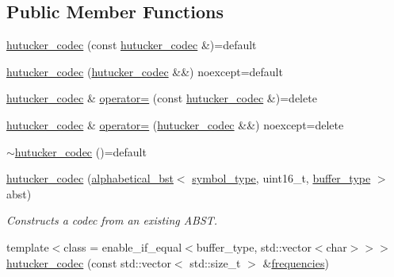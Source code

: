 \subsection*{Public Member Functions}
\begin{DoxyCompactItemize}
\item 
\mbox{\hyperlink{classirk_1_1hutucker__codec_af44e54c9f8257df294e4c879d610281b}{hutucker\+\_\+codec}} (const \mbox{\hyperlink{classirk_1_1hutucker__codec}{hutucker\+\_\+codec}} \&)=default
\item 
\mbox{\hyperlink{classirk_1_1hutucker__codec_a352279b1fadd10bf1cb6e5424cc7e340}{hutucker\+\_\+codec}} (\mbox{\hyperlink{classirk_1_1hutucker__codec}{hutucker\+\_\+codec}} \&\&) noexcept=default
\item 
\mbox{\hyperlink{classirk_1_1hutucker__codec}{hutucker\+\_\+codec}} \& \mbox{\hyperlink{classirk_1_1hutucker__codec_accb71e2dbf391b20a82d6d7d03f12e7b}{operator=}} (const \mbox{\hyperlink{classirk_1_1hutucker__codec}{hutucker\+\_\+codec}} \&)=delete
\item 
\mbox{\hyperlink{classirk_1_1hutucker__codec}{hutucker\+\_\+codec}} \& \mbox{\hyperlink{classirk_1_1hutucker__codec_a7d7253db1a48617db0176effd4f3fe0c}{operator=}} (\mbox{\hyperlink{classirk_1_1hutucker__codec}{hutucker\+\_\+codec}} \&\&) noexcept=delete
\item 
\mbox{\hyperlink{classirk_1_1hutucker__codec_ae028bba786a7f242d0ef617ec87fb581}{$\sim$hutucker\+\_\+codec}} ()=default
\item 
\mbox{\hyperlink{classirk_1_1hutucker__codec_a07f7f1c0f6fa0162dcafe5848fdfbb73}{hutucker\+\_\+codec}} (\mbox{\hyperlink{classirk_1_1alphabetical__bst}{alphabetical\+\_\+bst}}$<$ \mbox{\hyperlink{classirk_1_1hutucker__codec_af23dee5959ae2a69eea0ab324cf6ecb6}{symbol\+\_\+type}}, uint16\+\_\+t, \mbox{\hyperlink{classirk_1_1hutucker__codec_a995378c8c253dae9867a4b1762eeaf95}{buffer\+\_\+type}} $>$ abst)
\begin{DoxyCompactList}\small\item\em Constructs a codec from an existing A\+B\+ST. \end{DoxyCompactList}\item 
{\footnotesize template$<$class  = enable\+\_\+if\+\_\+equal$<$buffer\+\_\+type, std\+::vector$<$char$>$$>$$>$ }\\\mbox{\hyperlink{classirk_1_1hutucker__codec_a41e575e3badde26ab126e10f15ce8315}{hutucker\+\_\+codec}} (const std\+::vector$<$ std\+::size\+\_\+t $>$ \&\mbox{\hyperlink{irk-uncompress_8cpp_a2cd80733ced3d7eda8a6de0389cccc73}{frequencies}})

\end{DoxyCompactItemize}
